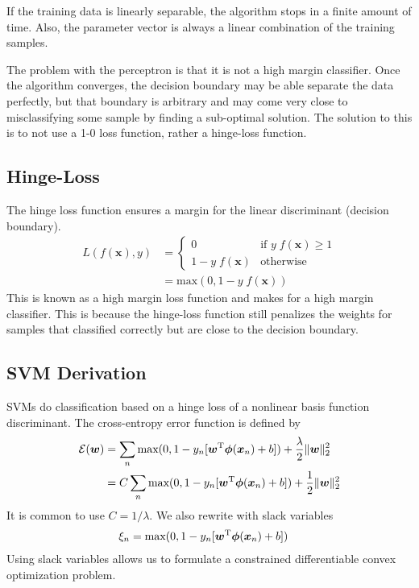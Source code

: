 \documentclass[11pt]{article}
\newcommand{\vct}[1]{\boldsymbol{#1}} %
\newcommand{\T}{^{\textrm T}} %
\begin{document}
If the training data is linearly separable, the algorithm stops in a finite amount of time. Also, the parameter vector is always a linear combination of the training samples.

The problem with the perceptron is that it is not a high margin classifier. Once the algorithm converges, the decision boundary may be able separate the data perfectly, but that boundary is arbitrary and may come very close to misclassifying some sample  by finding a sub-optimal solution. The solution to this is to not use a 1-0 loss function, rather a hinge-loss function. 

\subsection{Hinge-Loss}
The hinge loss function ensures a margin for the linear discriminant (decision boundary).
\begin{align*}
L(f(\vct{x}),y) &= \begin{cases} 0 & \text{if } y\;f(\vct{x}) \ge 1 \\ 1 - y\;f(\vct{x}) & \text{otherwise} \end{cases}\\
&= \text{max}(0, 1-y\;f(\vct{x}))
\end{align*}
This is known as a high margin loss function and makes for a high margin classifier. This is because the hinge-loss function still penalizes the weights for samples that classified correctly but are close to the decision boundary.

\subsection{SVM Derivation}
SVMs do classification based on a hinge loss of a nonlinear basis function discriminant. The cross-entropy error function is defined by
\begin{align*}
\mathcal{E}(\vct{w}) &= \sum_n \text{max}(0, 1- y_n[\vct{w}\T\vct{\phi}(\vct{x}_n) + b]) + \frac{\lambda}{2}\|\vct{w}\|_2^2\\
 &= C\sum_n \text{max}(0, 1- y_n[\vct{w}\T\vct{\phi}(\vct{x}_n) + b]) + \frac{1}{2}\|\vct{w}\|_2^2
 \end{align*}
 It is common to use $C = 1/\lambda$. We also rewrite with slack variables
 \begin{align*}
 \xi_n &= \text{max}(0, 1- y_n[\vct{w}\T\vct{\phi}(\vct{x}_n) + b])
 \end{align*}
 Using slack variables allows us to formulate a constrained differentiable convex optimization problem.
 
\end{document}
